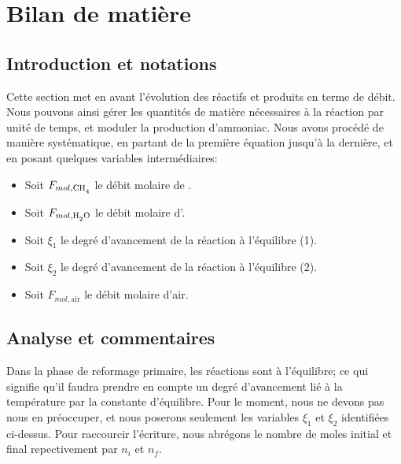 
\section{Bilan de matière}

\subsection{Introduction et notations}

Cette section met en avant l'évolution des réactifs et produits en terme de débit. 
Nous pouvons ainsi gérer les quantités de matière nécessaires à la réaction par unité de temps, et
moduler la production d'ammoniac. Nous avons procédé de manière systématique, en partant de la première
équation jusqu'à la dernière, et en posant quelques 
variables intermédiaires:

\begin{itemize}
	\item Soit $F_{mol, }$ le débit molaire de \ce{CH4}.
	\item Soit $F_{mol, }$ le débit molaire d'\ce{H2O}.
	\item Soit $\xi_1$ le degré d'avancement de la réaction à l'équilibre (1).
	\item Soit $\xi_2$ le degré d'avancement de la réaction à l'équilibre (2).
	\item Soit $F_{mol, \text{air}}$ le débit molaire d'air.
\end{itemize}

\subsection{Analyse et commentaires}
Dans la phase de reformage primaire, les réactions sont à l'équilibre; ce qui signifie qu'il faudra prendre en 
compte un degré d'avancement lié à la température par la constante d'équilibre. Pour le moment, nous ne devons pas 
nous en préoccuper, et nous poserons seulement les variables $\xi_1$ et $\xi_2$ identifiées ci-dessus. Pour raccourcir
l'écriture, nous abrégons le nombre de moles initial et final repectivement par $n_i$ et $n_f$.

